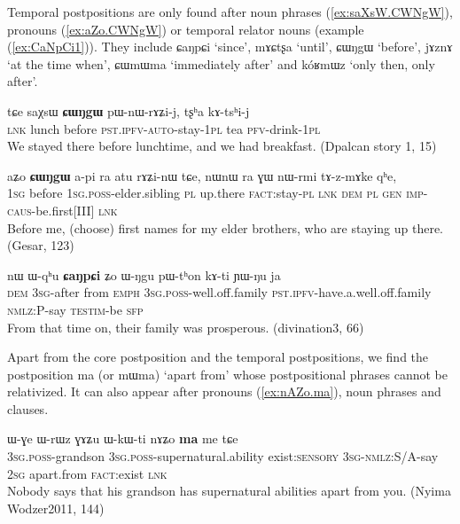 \documentclass[oldfontcommands,oneside,a4paper,11pt]{article}
\newcommand{\ipa}[1]{{\phon \mbox{#1}}} %
\newcommand{\refb}[1]{(\ref{#1})}
\begin{document}
Temporal postpositions   are only found after noun phrases \refb{ex:saXsW.CWNgW}, pronouns \refb{ex:aZo.CWNgW} or temporal relator nouns (example \refb{ex:CaNpCi1}). They include  \ipa{ɕaŋpɕi} `since', \ipa{mɤɕtʂa} `until', \ipa{ɕɯŋgɯ} `before', \ipa{jɤznɤ} `at the time when',  \ipa{ɕɯmɯma} `immediately after' and \ipa{kóʁmɯz}   `only then, only after'.

\begin{exe}
   \ex \label{ex:saXsW.CWNgW}
 \gll 
\ipa{tɕe}  	\ipa{saχsɯ}  	\ipa{\textbf{ɕɯŋgɯ}}  	\ipa{pɯ-nɯ-rɤʑi-j,}  	\ipa{tʂʰa}  	\ipa{kɤ-tsʰi-j}  \\
\textsc{lnk} lunch before \textsc{pst.ipfv-auto}-stay-\textsc{1pl} tea \textsc{pfv}-drink-\textsc{1pl} \\
\glt  We stayed there before lunchtime, and we had breakfast. 
(Dpalcan story 1, 15)
\end{exe}

\begin{exe}
   \ex \label{ex:aZo.CWNgW}
 \gll 
\ipa{aʑo}  	\ipa{\textbf{ɕɯŋgɯ}}  	\ipa{a-pi}  	\ipa{ra}  	\ipa{atu}  	\ipa{rɤʑi-nɯ}  	\ipa{tɕe,}  	\ipa{nɯnɯ}  	\ipa{ra}  	\ipa{ɣɯ}  	\ipa{nɯ-rmi}  	\ipa{tɤ-z-mɤke}  	\ipa{qʰe,}   \\
\textsc{1sg} before \textsc{1sg.poss}-elder.sibling \textsc{pl} up.there \textsc{fact}:stay-\textsc{pl} \textsc{lnk} \textsc{dem} \textsc{pl} \textsc{gen} \textsc{imp-caus}-be.first[III] \textsc{lnk} \\
\glt Before me, (choose) first names for my elder brothers, who are staying up there. (Gesar, 123)
 \end{exe}
\begin{exe}
\ex \label{ex:CaNpCi1} 
\gll  
\ipa{nɯ}   	\ipa{ɯ-qʰu}   	\textbf{\ipa{ɕaŋpɕi}}   	\ipa{ʑo}   	\ipa{ɯ-ŋgu}   	\ipa{pɯ-tʰon}   	\ipa{kɤ-ti}   	\ipa{ɲɯ-ŋu}   	\ipa{ja}   \\
\textsc{dem} \textsc{3sg}-after from  \textsc{emph} \textsc{3sg.poss}-well.off.family  \textsc{pst.ipfv}-have.a.well.off.family \textsc{nmlz:P}-say \textsc{testim}-be \textsc{sfp} \\
\glt  From that time on, their family was prosperous.   (divination3, 66)
\end{exe}

Apart from the core postposition and the temporal postpositions, we find the   postposition \ipa{ma} (or \ipa{mɯma}) `apart from'   whose postpositional phrases cannot be relativized. It can also appear after pronouns \refb{ex:nAZo.ma}, noun phrases and clauses.
 \begin{exe}
\ex \label{ex:nAZo.ma} 
\gll  
 \ipa{ɯ-ɣe}  	\ipa{ɯ-rɯz}  	\ipa{ɣɤʑu}  	\ipa{ɯ-kɯ-ti}  	 	\ipa{nɤʑo}  	\ipa{\textbf{ma}}  	\ipa{me}  	\ipa{tɕe}  \\
  \textsc{3sg.poss}-grandson   \textsc{3sg.poss}-supernatural.ability exist:\textsc{sensory} \textsc{3sg-nmlz:S/A}-say \textsc{2sg} apart.from \textsc{fact}:exist \textsc{lnk} \\
\glt Nobody says that his grandson has supernatural abilities apart from you. (Nyima Wodzer2011, 144)
\end{exe}
\end{document}
